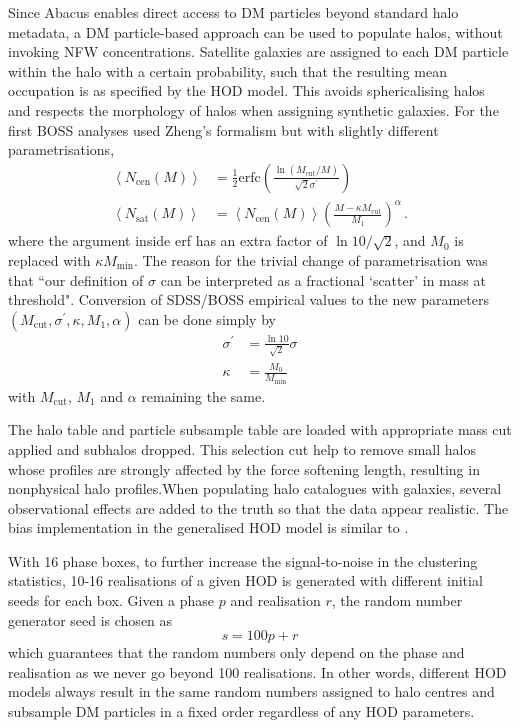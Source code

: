 \documentclass[fleqn,usenatbib]{mnras}
\begin{document}
			Since Abacus enables direct access to DM particles beyond standard halo metadata, a DM particle-based approach can be used to populate halos, without invoking NFW concentrations. Satellite galaxies are assigned to each DM particle within the halo with a certain probability, such that the resulting mean occupation is as specified by the HOD model. This avoids sphericalising halos and respects the morphology of halos when assigning synthetic galaxies. For the first BOSS analyses \cite{white11} used Zheng's formalism but with slightly different parametrisations,
			\begin{align}
				\left< N_\text{cen} (M) \right> &= \frac{1}{2} \mathrm{erfc} \left( \frac{\ln(M_\text{cut} / M)}{\sqrt{2} \sigma^\prime} \right) \\
				\left< N_\text{sat} (M) \right> &= \left< N_\text{cen} (M) \right> \left( \frac{M - \kappa M _\text{cut} }{M_1} \right) ^\alpha \, .
			\end{align}
			where the argument inside erf has an extra factor of $\ln 10 / \sqrt{2}$, and $M_0$ is replaced with $\kappa M_\text{min}$. The reason for the trivial change of parametrisation was that ``our definition of $\sigma$ can be interpreted as a fractional `scatter' in mass at threshold". Conversion of SDSS/BOSS empirical values to the new parameters $(M_\text{cut}, \sigma^\prime, \kappa, M_1, \alpha)$  can be done simply by
			\begin{align}
				\sigma ^\prime &= \frac{\ln 10}{\sqrt{2}} \sigma \\
				\kappa &= \frac{M_0}{M_\text{min}}
			\end{align}
			with $M_\text{cut}$, $M_1$ and $\alpha$ remaining the same.
			
			The halo table and particle subsample table are loaded with appropriate mass cut applied and subhalos dropped. This selection cut help to remove small halos whose profiles are strongly
			affected by the force softening length, resulting in nonphysical halo profiles.When populating halo catalogues with galaxies, several observational effects are added to the truth so that the data appear realistic. The bias implementation in the generalised HOD model is similar to \cite{yuan2018}.
			
			With 16 phase boxes, to further increase the signal-to-noise in the clustering statistics, 10-16 realisations of a given HOD is generated with different initial seeds for each box. Given a phase $p$ and realisation $r$, the random number generator seed is chosen as
			\begin{equation}
				s = 100p + r
			\end{equation}
			which guarantees that the random numbers only depend on the phase and realisation as we never go beyond 100 realisations. In other words, different HOD models always result in the same random numbers assigned to halo centres and subsample DM particles in a fixed order regardless of any HOD parameters. 
\end{document}
